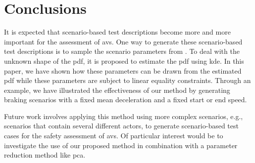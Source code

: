 \section{Conclusions}
\label{sec:conclusions}

It is expected that scenario-based test descriptions become more and more important for the assessment of \acp{av}. 
One way to generate these scenario-based test descriptions is to sample the scenario parameters from .
To deal with the unknown shape of the \ac{pdf}, it is proposed to estimate the \ac{pdf} using \ac{kde}. 
In this paper, we have shown how these parameters can be drawn from the estimated \ac{pdf} while these parameters are subject to linear equality constraints. 
Through an example, we have illustrated the effectiveness of our method by generating braking scenarios with a fixed mean deceleration and a fixed start or end speed. 

Future work involves applying this method using more complex scenarios, e.g., scenarios that contain several different actors, to generate scenario-based test cases for the safety assessment of \acp{av}.
Of particular interest would be to investigate the use of our proposed method in combination with a parameter reduction method like \ac{pca}. 
